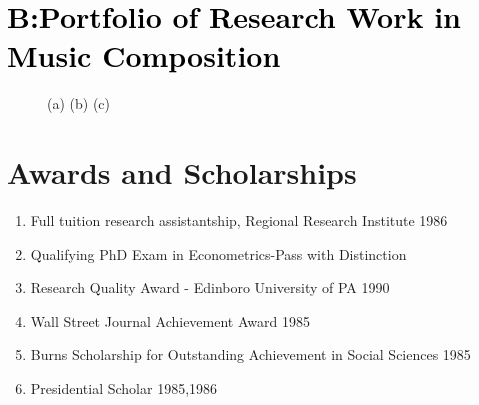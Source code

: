 \documentclass{TMLSStyleGuideResumeVitae}
\begin{document}
\section{\textcolor{black}{B:Portfolio of Research Work in Music Composition}}

\begin{figure}[h]
\centering
\begin{minipage}[b]{0.3\linewidth}
\end{minipage}\hfill
\begin{minipage}[b]{0.3\linewidth}
\end{minipage}\hfill	
\begin{minipage}[b]{0.3\linewidth}
\end{minipage}\hfill
\caption{(a) (b) (c) }
\label{fig:Figure1}
\end{figure} 

\newpage
\section{Awards and Scholarships}
\begin{enumerate} \itemsep -2pt
\item Full tuition research assistantship, Regional Research Institute 1986  \\
\item Qualifying PhD Exam in Econometrics-Pass with Distinction\\
\item Research Quality Award - Edinboro University of PA 1990\\
\item Wall Street Journal Achievement Award 1985\\
\item Burns Scholarship for Outstanding Achievement in Social Sciences 1985\\
\item Presidential Scholar 1985,1986\\
\end{enumerate}
\end{document}
